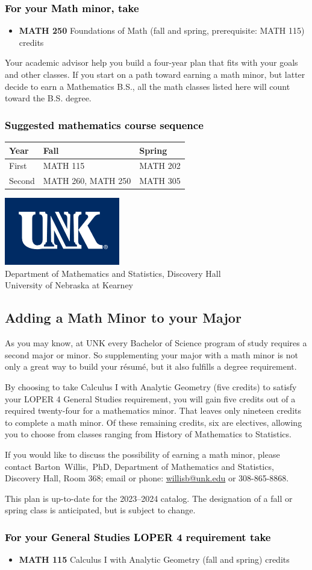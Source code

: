 \documentclass[11pt]{article}
\makeatletter
\newcommand{\calcone}{\textbf{MATH 115} Calculus I with Analytic Geometry (fall and spring) \dotfill 5 credits}
\newcommand{\calconeshort}{MATH 115}
\newcommand{\calctwoshort}{MATH 202}
\newcommand{\foundations}{\textbf{MATH 250} Foundations of Math (fall and spring, prerequisite: MATH 115)  \dotfill 3 credits}
\newcommand{\foundationsshort}{MATH 250}
\newcommand{\calcthreeshort}{MATH 260}
\newcommand{\diffeqshort}{MATH 305}
\newcommand{\contactbw}{\mbox{Barton Willis, PhD}, Department of Mathematics and Statistics,  Discovery Hall, Room 368;
email or phone: \href{mailto:willisb@unk.edu}{willisb@unk.edu} or 308-865-8868.}
\newcommand{\forinfo}[2]{If you would like to discuss the possibility of earning a math {#1}, please contact \contactbw}
\newcommand{\catalog}{2023--2024 }
\newcommand{\LOPER}{LOPER\xspace}
\newcommand{\uptodate}{This plan is up-to-date for  the \catalog catalog. The designation of a fall or spring class is 
anticipated, but  is subject to change.}
\newcommand{\myheading}{
\begin{flushleft}
\includegraphics[scale=0.35]{unk-logo}\\
\setcounter{footnote}{0}
\vspace{0.25in}
 \textcolor{unkblue}{Department of Mathematics and Statistics, Discovery Hall} \\
  \textcolor{unkblue}{University of Nebraska at Kearney}
\end{flushleft}}
\newcommand{\mathminorALT}{
\begin{center}
   \begin{tabular}[h]{| l | l | l|} 
      \hline
       \textbf{Year}          & \textbf{Fall}         &  \textbf{Spring}  \\ \hline 
      First & \calconeshort & \calctwoshort{}  \\  \hline
      Second &  \calcthreeshort{},  \foundationsshort{}  & \diffeqshort \\ \hline
         \end{tabular}
      \end{center}}
\makeatother
\begin{document}
\subsubsection*{\textcolor{black}{For your Math minor, take}}
\begin{itemize}
\item \foundations
\end{itemize}
\vspace{0.1in}
\noindent Your academic advisor help you build a four-year plan that
fits with your goals and other classes. If you start on a path 
toward earning  a math minor, but latter decide to earn a 
Mathematics B.S., all the math classes listed here will count 
toward the B.S. degree.


\subsubsection*{\textcolor{black}{Suggested mathematics course sequence}}

\mathminorALT




\newpage

\myheading

\subsection*{\textbf{\textcolor{unkblue}{Adding a Math Minor to your Major}}}

As you may know, at UNK every Bachelor of Science program of study requires a second
major or minor. So supplementing your major with a math minor is not only a great
way to build your r\'esum\'e, but it also fulfills a degree requirement.

By choosing to take Calculus I with Analytic Geometry (five credits) to satisfy
your \LOPER 4 General Studies requirement, you will gain five credits out of a
required twenty-four for a mathematics minor. That leaves only nineteen credits
to complete a math minor.  Of these remaining credits, six are electives, allowing
you to choose from classes ranging from History of Mathematics to Statistics.


\forinfo{minor}{program of study}

\uptodate

\subsubsection*{\textcolor{black}{For your General Studies \LOPER 4 requirement take}}
\begin{itemize}
\item \calcone
\end{itemize}
\end{document}
